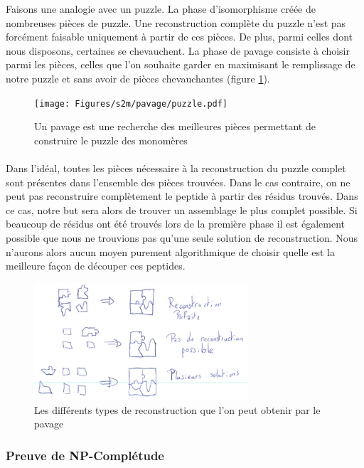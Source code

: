 \documentclass[12pt,french,twoside]{report}
\begin{document}
Faisons une analogie avec un puzzle. La phase d'isomorphisme créée de nombreuses pièces de puzzle.
Une reconstruction complète du puzzle n'est pas forcément faisable uniquement à partir de ces pièces.
De plus, parmi celles dont nous disposons, certaines se chevauchent.
La phase de pavage consiste à choisir parmi les pièces, celles que l'on souhaite garder en maximisant le remplissage de notre puzzle et sans avoir de pièces chevauchantes (figure \ref{puzzle}).

\begin{figure}
  \texttt{[image: Figures/s2m/pavage/puzzle.pdf]}
  \caption{\label{puzzle}Un pavage est une recherche des meilleures pièces permettant de construire le puzzle des monomères}
\end{figure}

\paragraph{}Dans l'idéal, toutes les pièces nécessaire à la reconstruction du puzzle complet sont présentes dans l'ensemble des
pièces trouvées. Dans le cas contraire, on ne peut pas reconstruire complètement le peptide à partir des résidus trouvés. 
Dans ce cas, notre
but sera alors de trouver un assemblage le plus complet possible. Si beaucoup de résidus ont été trouvés lors de la première phase
il est également possible que nous ne trouvions pas qu'une seule solution de reconstruction. Nous n'aurons alors aucun moyen
purement algorithmique de choisir quelle est la meilleure façon de découper ces peptides.

\begin{figure}
  \includegraphics[width=300px]{Figures/s2m/pavage/reconstructions.png}
  \caption{\label{reconstruction}Les différents types de reconstruction que l'on peut obtenir par le pavage}
\end{figure}


\subsubsection{Preuve de NP-Complétude}
\end{document}
